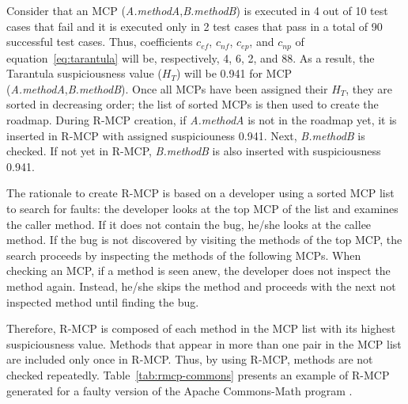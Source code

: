 Consider that an MCP (\textit{A.methodA},\textit{B.methodB}) is executed in 4
out of 10 test cases that fail and it is executed only in 2 test cases that pass
in a total of 90 successful test cases. Thus,  coefficients $c_{ef}$, $c_{nf}$,
$c_{ep}$, and $c_{np}$ of  equation~\ref{eq:tarantula} will be, respectively, 4,
6, 2, and 88. As a result, the Tarantula suspiciousness value ($H_T$) will be
0.941 for MCP (\textit{A.methodA},\textit{B.methodB}).  Once all MCPs have been
assigned  their $H_T$, they are sorted in decreasing order; the list of sorted
MCPs is then used to create the roadmap. During R-MCP creation, if
\textit{A.methodA} is  not in the roadmap yet, it is inserted in  R-MCP with
assigned suspiciouness 0.941. Next,  \textit{B.methodB} is checked. If not yet
in R-MCP, \textit{B.methodB} is also inserted with suspiciousness 0.941.

The rationale to create R-MCP is based on a developer using a sorted MCP list to
search for faults: the developer looks at the top MCP of the list and examines
the  caller method. If it does not contain the bug, he/she looks at the callee
method.  If the bug is not discovered by visiting the methods of the top MCP,
the search proceeds by inspecting the methods of the following MCPs.
When checking an MCP, if a method is seen anew, the developer does not inspect
the method again. Instead, he/she skips the method and proceeds with the next
not inspected method until finding the bug.

Therefore, R-MCP is composed of each method in the MCP list with its highest
suspiciousness value. Methods that appear in more than one pair in the MCP list
are included only once in R-MCP. Thus, by  using R-MCP, methods are not checked
repeatedly. Table~\ref{tab:rmcp-commons} presents an example of R-MCP generated
for a faulty version of the Apache Commons-Math program
\cite{souza2012depuracao}.


